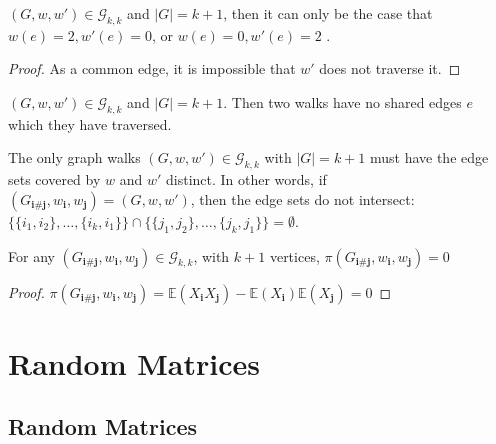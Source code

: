 \begin{lemma}
  \label{lem:one_walk_traverse_twice}
  \notready
    $(G, w, w') \in \mathcal{G}_{k, k}$ and $|G| = k + 1$, then it can only be the case that
    $w(e) = 2, w'(e) = 0$, or $w(e) = 0, w'(e) = 2$ .
\end{lemma}

\begin{proof}
As a common edge, it is impossible that $w'$ does not traverse it.
\end{proof}


\begin{lemma}
  \label{lem:no_shared_edges}
  $(G, w, w') \in \mathcal{G}_{k, k}$ and $|G| = k + 1$. Then two walks have no shared edges $e$ which they have traversed.
\end{lemma}


\begin{lemma}
  \label{lem:disjoint_edge_set}
  \notready
  The only graph walks $(G,w,w')\in \mathcal{G}_{k,k}$ with $|G|=k+1$ must have the edge sets covered by $w$ and $w'$ distinct.
  In other words, if $(G_{\mathbf{i}\#\mathbf{j}},w_\mathbf{i},w_\mathbf{j}) = (G,w,w')$, then the edge sets do not intersect:
  $\{\{i_1,i_2\},\ldots,\{i_k,i_1\}\}\cap\{\{j_1,j_2\},\ldots,\{j_k,j_1\}\}=\emptyset$.
\end{lemma}


\begin{lemma}
  \label{lem:G_leq_k}
  \notready
  For any $(G_{\mathbf{i}\#\mathbf{j}},w_\mathbf{i},w_\mathbf{j}) \in \mathcal{G}_{k,k}$, with
  $k + 1$ vertices, $\pi(G_{\mathbf{i}\#\mathbf{j}},w_\mathbf{i},w_\mathbf{j})  = 0$
\end{lemma}

\begin{proof}
  $\pi(G_{\mathbf{i}\#\mathbf{j}},w_\mathbf{i},w_\mathbf{j}) = \mathbb{E}(X_{\mathbf{i}}X_{\mathbf{j}}) - \mathbb{E}(X_{\mathbf{i}})\mathbb{E}(X_{\mathbf{j}})  = 0$
\end{proof}


\chapter{Random Matrices}

\section{Random Matrices}


